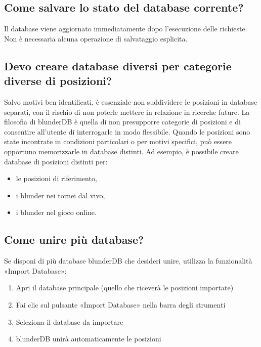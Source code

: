 \documentclass[letterpaper,10pt,italian]{sphinxmanual}
\begin{document}
\subsection{Come salvare lo stato del database corrente?}
\label{\detokenize{faq:comment-sauvegarder-la-base-de-donnees-courante}}
\sphinxAtStartPar
Il database viene aggiornato immediatamente dopo l’esecuzione delle richieste. Non è necessaria alcuna operazione di salvataggio esplicita.


\subsection{Devo creare database diversi per categorie diverse di posizioni?}
\label{\detokenize{faq:dois-je-creer-differentes-bases-de-donnees-pour-differentes-categories-de-positions}}
\sphinxAtStartPar
Salvo motivi ben identificati, è essenziale non suddividere le posizioni in database separati, con il rischio di non poterle mettere in relazione in ricerche future. La filosofia di blunderDB è quella di non presupporre categorie di posizioni  e di consentire all’utente di interrogarle in modo flessibile. Quando le posizioni sono state incontrate in condizioni particolari o per motivi specifici, può essere opportuno memorizzarle in database distinti. Ad esempio, è possibile creare database di posizioni distinti per:
\begin{itemize}
\item {} 
\sphinxAtStartPar
le posizioni di riferimento,

\item {} 
\sphinxAtStartPar
i blunder nei tornei dal vivo,

\item {} 
\sphinxAtStartPar
i blunder nel gioco online.

\end{itemize}


\subsection{Come unire più database?}
\label{\detokenize{faq:comment-fusionner-plusieurs-bases-de-donnees}}
\sphinxAtStartPar
Se disponi di più database blunderDB che desideri unire, utilizza la funzionalità «Import Database»:
\begin{enumerate}
%
\item {} 
\sphinxAtStartPar
Apri il database principale (quello che riceverà le posizioni importate)

\item {} 
\sphinxAtStartPar
Fai clic sul pulsante «Import Database» nella barra degli strumenti

\item {} 
\sphinxAtStartPar
Seleziona il database da importare

\item {} 
\sphinxAtStartPar
blunderDB unirà automaticamente le posizioni

\end{enumerate}
\end{document}
